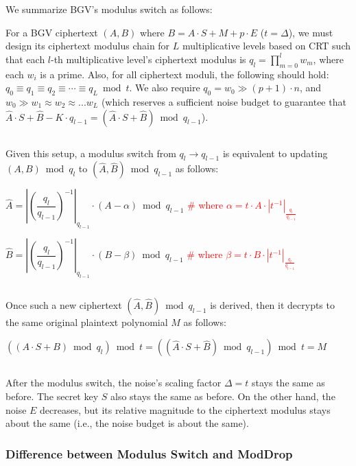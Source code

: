 We summarize BGV's modulus switch as follows:


\begin{tcolorbox}[title={\textbf{\tboxlabel{\ref*{subsec:bgv-modulus-switch}} BGV's Modulus Switch}}]

For a BGV ciphertext $(A, B)$ where $B = A\cdot S + M + p \cdot E$ ($t = \Delta$), we must design its ciphertext modulus chain for $L$ multiplicative levels based on CRT such that each $l$-th multiplicative level's ciphertext modulus is $q_l = \prod\limits_{m=0}^{l}w_m$, where each $w_i$ is a prime. Also, for all ciphertext moduli, the following should hold: $q_0 \equiv q_1 \equiv q_2 \equiv \cdots \equiv q_L \bmod t$. We also require $q_0 = w_0 \gg (p + 1)\cdot n$, and $w_0 \gg w_1 \approx w_2 \approx ... w_L$ (which reserves a sufficient noise budget to guarantee that $\hat A\cdot S + \hat B - K\cdot q_{l-1} = (\hat A\cdot S + \hat B) \bmod q_{l-1}$).

$ $

Given this setup, a modulus switch from $q_l \rightarrow q_{l-1}$ is equivalent to updating $(A, B) \bmod q_l$ to $(\hat A, \hat B) \bmod q_{l-1}$ as follows:


$ \hat{A} = \left|\left(\dfrac{q_{l}}{q_{l-1}}\right)^{-1}\right|_{q_{l-1}} \cdot (A - \alpha) \bmod q_{l-1}$ \textcolor{red}{ \# where $\alpha = t\cdot  A \cdot |t^{-1}|_{\frac{q_l}{q_{l-1}}}$}

$ \hat{B} = \left|\left(\dfrac{q_{l}}{q_{l-1}}\right)^{-1}\right|_{q_{l-1}} \cdot (B - \beta) \bmod q_{l-1}$ \textcolor{red}{ \# where $\beta = t\cdot  B \cdot |t^{-1}|_{\frac{q_l}{q_{l-1}}}$}

$ $

Once such a new ciphertext $(\hat A, \hat B) \bmod q_{l-1}$ is derived, then it decrypts to the same original plaintext polynomial $M$ as follows:

$((A\cdot S + B) \bmod q_{l}) \bmod t = ((\hat A \cdot S + \hat B) \bmod q_{l-1}) \bmod t = M$

$ $

After the modulus switch, the noise's scaling factor $\Delta = t$ stays the same as before. The secret key $S$ also stays the same as before. On the other hand, the noise $E$ decreases, but its relative magnitude to the ciphertext modulus stays about the same (i.e., the noise budget is about the same). 

\end{tcolorbox}



\subsubsection{Difference between Modulus Switch and \textsf{ModDrop}}
\label{subsubsec:bgv-moddrop-vs-modswitch}

